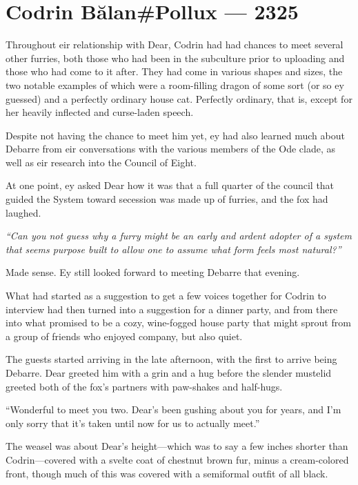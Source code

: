 \hypertarget{codrin-bux103lanpollux-2325}{%
\chapter{Codrin Bălan\#Pollux — 2325}\label{codrin-bux103lanpollux-2325}}

Throughout eir relationship with Dear, Codrin had had chances to meet several other furries, both those who had been in the subculture prior to uploading and those who had come to it after. They had come in various shapes and sizes, the two notable examples of which were a room-filling dragon of some sort (or so ey guessed) and a perfectly ordinary house cat. Perfectly ordinary, that is, except for her heavily inflected and curse-laden speech.

Despite not having the chance to meet him yet, ey had also learned much about Debarre from eir conversations with the various members of the Ode clade, as well as eir research into the Council of Eight.

At one point, ey asked Dear how it was that a full quarter of the council that guided the System toward secession was made up of furries, and the fox had laughed.

\emph{``Can you not guess why a furry might be an early and ardent adopter of a system that seems purpose built to allow one to assume what form feels most natural?''}

Made sense. Ey still looked forward to meeting Debarre that evening.

What had started as a suggestion to get a few voices together for Codrin to interview had then turned into a suggestion for a dinner party, and from there into what promised to be a cozy, wine-fogged house party that might sprout from a group of friends who enjoyed company, but also quiet.

The guests started arriving in the late afternoon, with the first to arrive being Debarre. Dear greeted him with a grin and a hug before the slender mustelid greeted both of the fox's partners with paw-shakes and half-hugs.

``Wonderful to meet you two. Dear's been gushing about you for years, and I'm only sorry that it's taken until now for us to actually meet.''

The weasel was about Dear's height---which was to say a few inches shorter than Codrin---covered with a svelte coat of chestnut brown fur, minus a cream-colored front, though much of this was covered with a semiformal outfit of all black.

